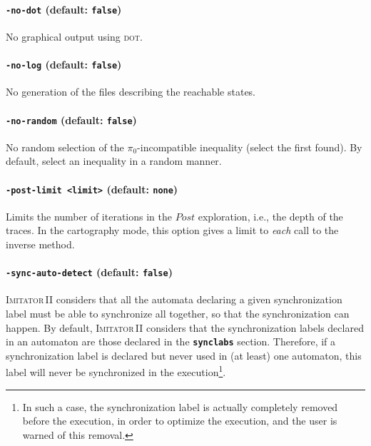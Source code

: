 \documentclass[a4paper,10pt]{article}
\newcommand{\gdot}{\textsc{dot}}
\newcommand{\imitatordeux}{\textsc{Imitator}\,II}
\newcommand{\code}[1]{\textbf{\texttt{#1}}}
\begin{document}
\paragraph{\code{-no-dot} (default: \code{false})}
No graphical output using \gdot{}.

\paragraph{\code{-no-log} (default: \code{false})}
No generation of the files describing the reachable states.

\paragraph{\code{-no-random} (default: \code{false})}
No random selection of the $\pi_0$-incompatible inequality (select the first found).
By default, select an inequality in a random manner.

\paragraph{\code{-post-limit <limit>} (default: \code{none})}
Limits the number of iterations in the $\mathit{Post}$ exploration, i.e., the depth of the traces.
In the cartography mode, this option gives a limit to \emph{each} call to the inverse method.

\paragraph{\code{-sync-auto-detect} (default: \code{false})}
\imitatordeux{} considers that all the automata declaring a given synchronization label must be able to synchronize all together, so that the synchronization can happen.
By default, \imitatordeux{} considers that the synchronization labels declared in an automaton are those declared in the \code{synclabs} section.
Therefore, if a synchronization label is declared but never used in (at least) one automaton, this label will never be synchronized in the execution\footnote{In such a case, the synchronization label is actually completely removed before the execution, in order to optimize the execution, and the user is warned of this removal.}.
\end{document}
